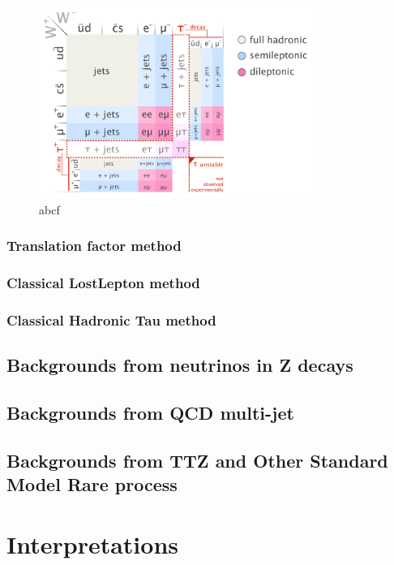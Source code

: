\begin{figure}[htbp]
 \begin{center}
  \includegraphics[width=0.8\textwidth]{figures/c4/c4_top_w_decaymod.png}
 \end{center}
 \caption{abcf}
 \label{fig:c4twdecaymod}
\end{figure}

\clearpage
\subsubsection{Translation factor method}
\label{sec:c4bgtf}


\clearpage
\subsubsection{Classical LostLepton method}
\label{sec:c4bgll}


\clearpage
\subsubsection{Classical Hadronic Tau method}
%

\clearpage
\subsection{Backgrounds from neutrinos in Z decays}
%

\clearpage
\subsection{Backgrounds from QCD multi-jet}
\label{sec:c4bgqcd}


\clearpage
\subsection{Backgrounds from TTZ and Other Standard Model Rare process}
\label{sec:c4bgttzrare}


\clearpage
\section{Interpretations}
